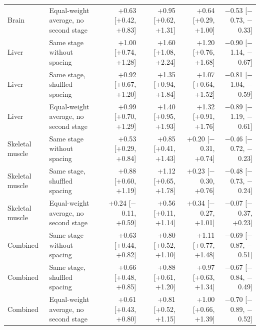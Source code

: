 \begin{table}[H]
\begin{tabular}{llrrrr}
Brain & Equal-weight average, no second stage & +0.63 [+0.42, +0.83] & +0.95 [+0.62, +1.31] & +0.64 [+0.29, +1.00] & $-$0.53 [$-$0.73, $-$0.33] \\
Liver & Same stage without spacing & +1.00 [+0.74, +1.28] & +1.60 [+1.08, +2.24] & +1.20 [+0.76, +1.68] & $-$0.90 [$-$1.14, $-$0.67] \\
Liver & Same stage, shuffled spacing & +0.92 [+0.67, +1.20] & +1.35 [+0.94, +1.84] & +1.07 [+0.64, +1.52] & $-$0.81 [$-$1.04, $-$0.59] \\
Liver & Equal-weight average, no second stage & +0.99 [+0.70, +1.29] & +1.40 [+0.95, +1.93] & +1.32 [+0.91, +1.76] & $-$0.89 [$-$1.19, $-$0.61] \\
Skeletal muscle & Same stage without spacing & +0.53 [+0.29, +0.84] & +0.85 [+0.41, +1.43] & +0.20 [$-$0.31, +0.74] & $-$0.46 [$-$0.72, $-$0.23] \\
Skeletal muscle & Same stage, shuffled spacing & +0.88 [+0.60, +1.19] & +1.12 [+0.65, +1.78] & +0.23 [$-$0.30, +0.76] & $-$0.48 [$-$0.73, $-$0.24] \\
Skeletal muscle & Equal-weight average, no second stage & +0.24 [$-$0.11, +0.59] & +0.56 [+0.11, +1.14] & +0.34 [$-$0.27, +1.01] & $-$0.07 [$-$0.37, +0.23] \\
Combined & Same stage without spacing & +0.63 [+0.44, +0.82] & +0.80 [+0.52, +1.10] & +1.11 [+0.77, +1.48] & $-$0.69 [$-$0.87, $-$0.51] \\
Combined & Same stage, shuffled spacing & +0.66 [+0.48, +0.85] & +0.88 [+0.61, +1.20] & +0.97 [+0.63, +1.34] & $-$0.67 [$-$0.84, $-$0.49] \\
Combined & Equal-weight average, no second stage & +0.61 [+0.43, +0.80] & +0.81 [+0.52, +1.15] & +1.00 [+0.66, +1.39] & $-$0.70 [$-$0.89, $-$0.52] \\
\bottomrule
\end{tabular}
\end{table}
